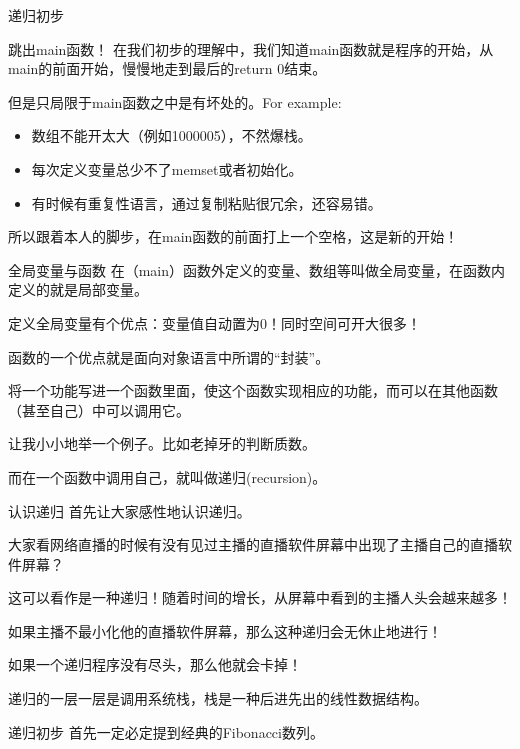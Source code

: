 \documentclass[UTF-8]{beamer}
\begin{document}
\begin{section}{递归初步}
\begin{frame}{跳出main函数！}
    \pause
    在我们初步的理解中，我们知道main函数就是程序的开始，从main的前面开始，慢慢地走到最后的return 0结束。\pause

    但是只局限于main函数之中是有坏处的。For example: \pause

    \begin{itemize}
      \item 数组不能开太大（例如1000005），不然爆栈。
      \item 每次定义变量总少不了memset或者初始化。
      \item 有时候有重复性语言，通过复制粘贴很冗余，还容易错。
    \end{itemize}
    \pause
    所以跟着本人的脚步，在main函数的前面打上一个空格，这是新的开始！
\end{frame}
\begin{frame}{全局变量与函数}
    \pause
    在（main）函数外定义的变量、数组等叫做全局变量，在函数内定义的就是局部变量。\pause

    定义全局变量有个优点：变量值自动置为0！同时空间可开大很多！\pause

    函数的一个优点就是面向对象语言中所谓的“封装”。\pause

    将一个功能写进一个函数里面，使这个函数实现相应的功能，而可以在其他函数（甚至自己）中可以调用它。\pause

    让我小小地举一个例子。比如老掉牙的判断质数。\pause

    而在一个函数中调用自己，就叫做递归(recursion)。
\end{frame}
\begin{frame}{认识递归}
    \pause
    首先让大家感性地认识递归。\pause

    大家看网络直播的时候有没有见过主播的直播软件屏幕中出现了主播自己的直播软件屏幕？\pause

    这可以看作是一种递归！随着时间的增长，从屏幕中看到的主播人头会越来越多！\pause

    如果主播不最小化他的直播软件屏幕，那么这种递归会无休止地进行！\pause

    如果一个递归程序没有尽头，那么他就会卡掉！\pause

    递归的一层一层是调用系统栈，栈是一种后进先出的线性数据结构。
\end{frame}
\begin{frame}{递归初步}
    \pause
    首先一定必定提到经典的Fibonacci数列。\pause


\end{frame}
\end{section}
\end{document}
